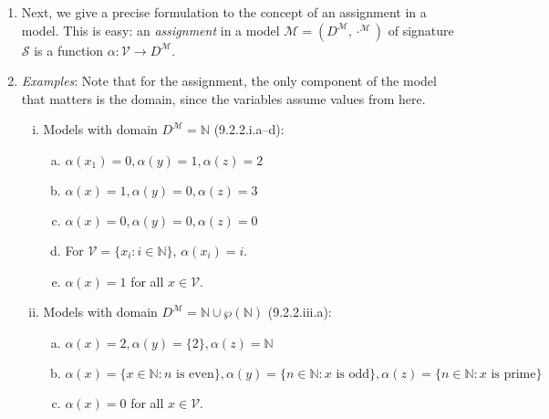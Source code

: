 \begin{enumerate}[\thesection.1]
		\item Next, we give a precise formulation to the concept of an assignment in a model. This is easy: an \emph{assignment} in a model $\mathcal{M}=(D^\mathcal{M},\cdot^\mathcal{M})$ of signature $\mathcal{S}$ is a function $\alpha:\mathcal{V}\to D^\mathcal{M}$. 
		
		\item \emph{Examples}: Note that for the assignment, the only component of the model that matters is the domain, since the variables assume values from here.
		
		\begin{enumerate}[(i)]
		
			\item Models with domain $D^\mathcal{M}=\mathbb{N}$ (9.2.2.i.a--d):
			
				\begin{enumerate}[(a)]
				
					\item $\alpha(x_1)=0, \alpha(y)=1, \alpha(z)=2$
					
					\item $\alpha(x)=1, \alpha(y)=0, \alpha(z)=3$
					
					\item $\alpha(x)=0, \alpha(y)=0, \alpha(z)=0$
					
					\item For $\mathcal{V}=\{x_i:i\in\mathbb{N}\}$, $\alpha(x_i)=i$.
					\item $\alpha(x)=1$ for all $x\in\mathcal{V}$.
									
				\end{enumerate}
				
			\item Models with domain $D^\mathcal{M}=\mathbb{N}\cup\wp(\mathbb{N})$ (9.2.2.iii.a):

					\begin{enumerate}[(a)]

						\item $\alpha(x)=2, \alpha(y)=\{2\}, \alpha(z)=\mathbb{N}$
						
						\item $\alpha(x)=\{x\in\mathbb{N}:n\text{ is even}\}, \alpha(y)=\{n\in\mathbb{N}:x\text{ is odd}\}, \alpha(z)=\{n\in\mathbb{N}:x\text{ is prime}\}$
						
						\item $\alpha(x)=0$ for all $x\in\mathcal{V}$.

						\end{enumerate}


\end{enumerate}
\end{enumerate}
